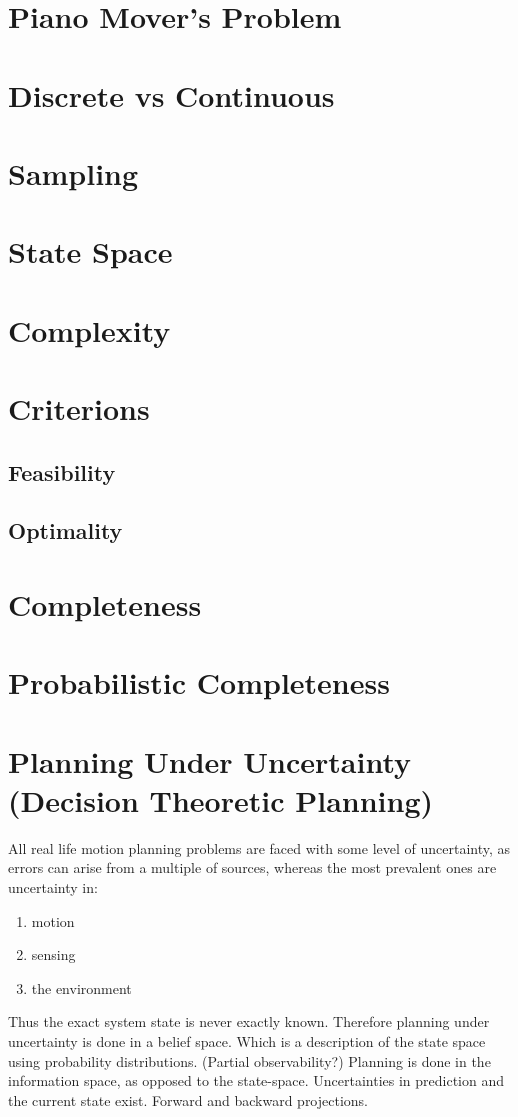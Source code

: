 \section{Piano Mover's Problem}

\section{Discrete vs Continuous}

\section{Sampling}

\section{State Space}

\section{Complexity}

\section{Criterions}

\subsection{Feasibility}
\subsection{Optimality}

\section{Completeness}

\section{Probabilistic Completeness}

\section{Planning Under Uncertainty (Decision Theoretic Planning)}

All real life motion planning problems are faced with some level of uncertainty,
as errors can arise from a multiple of sources, whereas the most prevalent ones
are uncertainty in:
\begin{enumerate}
\item motion
\item sensing
\item the environment
\end{enumerate}
Thus the exact system state is never exactly known. Therefore planning under
uncertainty is done in a belief space. Which is a description of the state space
using probability distributions. (Partial observability?)
Planning is done in the information space, as opposed to the state-space.
Uncertainties in prediction and the current state exist.
Forward and backward projections.

